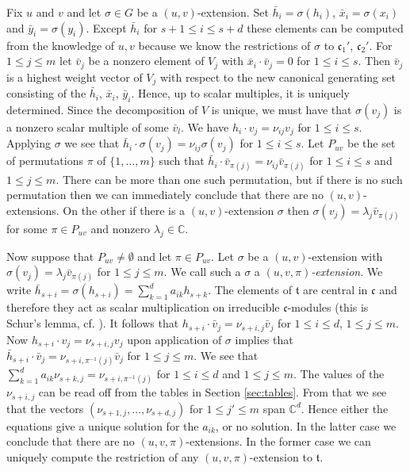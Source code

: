 \documentclass[a4paper,10pt]{amsart}
\newcommand{\C}{\mathbb{C}}
\newcommand{\mf}{\mathfrak}
\renewcommand{\c}{\mf{c}}
\newcommand{\ttt}{\mf{t}}
\numberwithin{equation}{section}
\theoremstyle{remark}
\theoremstyle{remark}
\begin{document}
Fix $u$ and $v$ and let $\sigma\in G$ be a $(u,v)$-extension. 
Set $\bar h_i = \sigma(h_i)$, $\bar x_i = \sigma(x_i)$
and $\bar y_i = \sigma(y_i)$. Except $\bar h_i$ for $s+1\leq i
\leq s+d$ these elements can be computed from the knowledge of $u,v$ because
we know the restrictions of $\sigma$ to $\c_1'$, $\c_2'$. 
For $1\leq j\leq m$ let $\bar v_j$ be a nonzero element of
$V_j$ with $\bar x_i \cdot \bar v_j = 0$ for $1\leq i\leq s$. Then $\bar v_j$
is a highest weight vector of $V_j$ with respect to the new canonical
generating set consisting of the $\bar h_i$, $\bar x_i$, $\bar y_i$.
Hence, up to scalar multiples, it is uniquely determined. 
Since the decomposition of $V$ is unique, we must have that $\sigma(v_j)$ is
a nonzero scalar multiple of some $\bar v_l$. We have $h_i \cdot v_j =
\nu_{ij} v_j$ for $1\leq i\leq s$. Applying $\sigma$ we see that $\bar h_i \cdot
\sigma(v_j) = \nu_{ij} \sigma(v_j)$ for $1\leq i\leq s$. Let $P_{uv}$ be the
set of permutations $\pi$ 
of $\{1,\ldots,m\}$ such that $\bar h_i \cdot \bar v_{\pi(j)} = \nu_{ij}
\bar v_{\pi(j)}$ for $1\leq i\leq s$ and $1\leq j\leq m$.
There can be more than one such permutation, but if there
is no such permutation then we can immediately conclude that there are
no $(u,v)$-extensions. On the other if there is a $(u,v)$-extension
$\sigma$ then $\sigma(v_j) = \lambda_j \bar v_{\pi(j)}$ for
some $\pi\in P_{uv}$ and nonzero $\lambda_j\in \C$.

Now suppose that $P_{uv}\neq\emptyset$ and let $\pi\in P_{uv}$. Let $\sigma$ be
a $(u,v)$-extension with $\sigma(v_j) = \lambda_j \bar v_{\pi(j)}$
for $1\leq j\leq m$. We call
such a $\sigma$ a {\em $(u,v,\pi)$-extension}. We write $\bar h_{s+i}=
\sigma(h_{s+i}) = \sum_{k=1}^d a_{ik} h_{s+k}$. The elements of $\ttt$ are
central in $\c$ and therefore they act as scalar multiplication on irreducible
$\c$-modules (this is Schur's lemma, cf. \cite[\S 6.1]{hum}). It follows that
$h_{s+i}\cdot \bar v_j = \nu_{s+i,j} \bar v_j$ for $1\leq i\leq d$,
$1\leq j\leq m$. Now  $h_{s+i}\cdot v_j=
\nu_{s+i,j} v_j$ upon application of $\sigma$ implies that $\bar h_{s+i} \cdot
\bar v_j = \nu_{s+i,\pi^{-1}(j)} \bar v_j$ for $1\leq j\leq m$.
We see that $\sum_{k=1}^d a_{ik}\nu_{s+k,j} = \nu_{s+i,\pi^{-1}(j)}$ for $1\leq i\leq
d$ and $1\leq j\leq m$. The values of the $\nu_{s+i,j}$ can be read off from
the tables in Section \ref{sec:tables}. From that we see that the vectors
$(\nu_{s+1,j},\ldots,\nu_{s+d,j})$ for $1\leq j'\leq m$ span $\C^d$.
Hence either the equations
give a unique solution for the $a_{ik}$, or no solution. In the latter case we
conclude that there are no $(u,v,\pi)$-extensions. In the former case
we can uniquely compute the restriction of any $(u,v,\pi)$-extension to $\ttt$.
\end{document}
